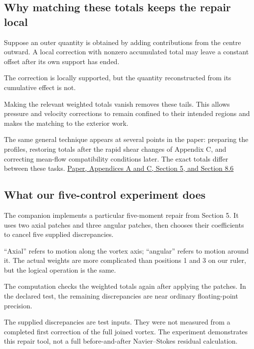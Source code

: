 \documentclass[
  english,
  11pt,
]{article}
\begin{document}
\subsection{Why matching these totals keeps the repair
local}\label{why-matching-these-totals-keeps-the-repair-local}

Suppose an outer quantity is obtained by adding contributions from the
centre outward. A local correction with nonzero accumulated total may
leave a constant offset after its own support has ended.

The correction is locally supported, but the quantity reconstructed from
its cumulative effect is not.

Making the relevant weighted totals vanish removes these tails. This
allows pressure and velocity corrections to remain confined to their
intended regions and makes the matching to the exterior work.

The same general technique appears at several points in the paper:
preparing the profiles, restoring totals after the rapid shear changes
of Appendix C, and correcting mean-flow compatibility conditions later.
The exact totals differ between these tasks.
\href{https://cdn.openai.com/pdf/32d9f210-8b73-45e0-91bc-82a30aef8a9a/navier-stokes.pdf}{Paper,
Appendices A and C, Section 5, and Section 8.6}

\subsection{What our five-control experiment
does}\label{what-our-five-control-experiment-does}

The companion implements a particular five-moment repair from Section 5.
It uses two axial patches and three angular patches, then chooses their
coefficients to cancel five supplied discrepancies.

``Axial'' refers to motion along the vortex axis; ``angular'' refers to
motion around it. The actual weights are more complicated than positions
1 and 3 on our ruler, but the logical operation is the same.

The computation checks the weighted totals again after applying the
patches. In the declared test, the remaining discrepancies are near
ordinary floating-point precision.

The supplied discrepancies are test inputs. They were not measured from
a completed first correction of the full joined vortex. The experiment
demonstrates this repair tool, not a full before-and-after
Navier--Stokes residual calculation.
\end{document}
